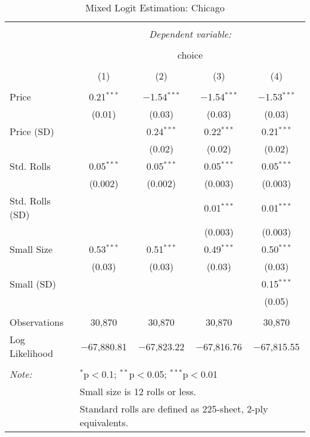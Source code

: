 
\begin{table}[!htbp] \centering 
  \caption{Mixed Logit Estimation: Chicago} 
  \label{tab:mnlChicagoRandCoefNoObsHet} 
\begin{tabular}{@{\extracolsep{5pt}}lcccc} 
\\[-1.8ex]\hline 
\hline \\[-1.8ex] 
 & \multicolumn{4}{c}{\textit{Dependent variable:}} \\ 
\cline{2-5} 
\\[-1.8ex] & \multicolumn{4}{c}{choice} \\ 
\\[-1.8ex] & (1) & (2) & (3) & (4)\\ 
\hline \\[-1.8ex] 
 Price & 0.21$^{***}$ & $-$1.54$^{***}$ & $-$1.54$^{***}$ & $-$1.53$^{***}$ \\ 
  & (0.01) & (0.03) & (0.03) & (0.03) \\ 
  Price (SD) &  & 0.24$^{***}$ & 0.22$^{***}$ & 0.21$^{***}$ \\ 
  &  & (0.02) & (0.02) & (0.02) \\ 
  Std. Rolls & 0.05$^{***}$ & 0.05$^{***}$ & 0.05$^{***}$ & 0.05$^{***}$ \\ 
  & (0.002) & (0.002) & (0.003) & (0.003) \\ 
  Std. Rolls (SD) &  &  & 0.01$^{***}$ & 0.01$^{***}$ \\ 
  &  &  & (0.003) & (0.003) \\ 
  Small Size & 0.53$^{***}$ & 0.51$^{***}$ & 0.49$^{***}$ & 0.50$^{***}$ \\ 
  & (0.03) & (0.03) & (0.03) & (0.03) \\ 
  Small (SD) &  &  &  & 0.15$^{***}$ \\ 
  &  &  &  & (0.05) \\ 
 \hline \\[-1.8ex] 
Observations & 30,870 & 30,870 & 30,870 & 30,870 \\ 
Log Likelihood & $-$67,880.81 & $-$67,823.22 & $-$67,816.76 & $-$67,815.55 \\ 
\hline 
\hline \\[-1.8ex] 
\textit{Note:}  & \multicolumn{4}{l}{$^{*}$p$<$0.1; $^{**}$p$<$0.05; $^{***}$p$<$0.01} \\ 
 & \multicolumn{4}{l}{Small size is 12 rolls or less.} \\ 
 & \multicolumn{4}{l}{Standard rolls are defined as 225-sheet, 2-ply equivalents.} \\ 
\end{tabular} 
\end{table} 
